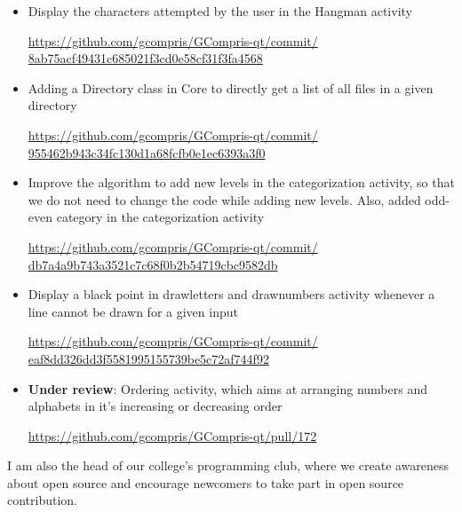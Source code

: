 \documentclass[preprint,12pt]{elsarticle}
\begin{document}
\begin{itemize}

\item Display the characters attempted by the user in the Hangman activity

\href{https://github.com/gcompris/GCompris-qt/commit/8ab75acf49431c685021f3cd0e58cf31f3fa4568}{https://github.com/gcompris/GCompris-qt/commit/\\8ab75acf49431c685021f3cd0e58cf31f3fa4568}

\item Adding a Directory class in Core to directly get a list of all files in a given directory

\href{https://github.com/gcompris/GCompris-qt/commit/955462b943c34fc130d1a68fcfb0e1ec6393a3f0}{https://github.com/gcompris/GCompris-qt/commit/\\955462b943c34fc130d1a68fcfb0e1ec6393a3f0}

\item Improve the algorithm to add new levels in the categorization activity, so that we do not need to change the code while adding new levels. Also, added odd-even category in the categorization activity

\href{https://github.com/gcompris/GCompris-qt/commit/db7a4a9b743a3521c7c68f0b2b54719cbc9582db}{https://github.com/gcompris/GCompris-qt/commit/\\db7a4a9b743a3521c7c68f0b2b54719cbc9582db}

\item Display a black point in drawletters and drawnumbers activity whenever a line cannot be drawn for a given input

\href{https://github.com/gcompris/GCompris-qt/commit/eaf8dd326dd3f5581995155739be5c72af744f92}{https://github.com/gcompris/GCompris-qt/commit/\\eaf8dd326dd3f5581995155739be5c72af744f92}

\item \textbf{Under review}: Ordering activity, which aims at arranging numbers and alphabets in it's increasing or decreasing order

\href{https://github.com/gcompris/GCompris-qt/pull/172}{https://github.com/gcompris/GCompris-qt/pull/172}

\end{itemize}

I am also the head of our college's programming club, where we create awareness about open source and encourage newcomers to take part in open source contribution.
\end{document}
